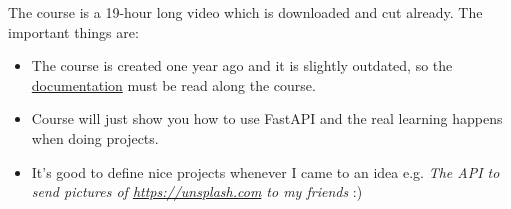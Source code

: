 			\noindent The course is a 19-hour long video which is downloaded and cut already. The important things are:
			\begin{itemize}
				\item The course is created one year ago and it is slightly outdated, so the \href{https://fastapi.tiangolo.com}{documentation} must be read along the course.
				
				\item Course will just show you how to use FastAPI and the real learning happens when doing projects.
				
				\item It's good to define nice projects whenever I came to an idea
				e.g. \textit{The API to send pictures of \url{https://unsplash.com} to my friends} :)
			\end{itemize}

